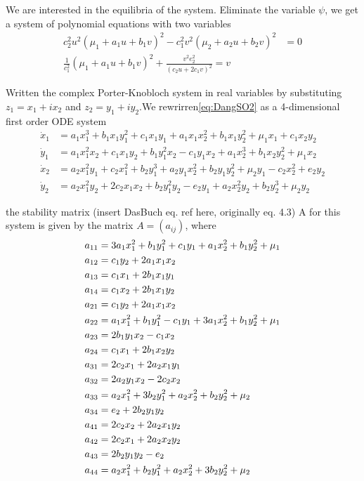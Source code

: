 \documentclass{article}
\begin{document}
We are interested in the equilibria of the system. Eliminate the variable $\psi$, we get a system of polynomial equations with two variables
\begin{align}
c_2^2u^2(\mu_1+a_1u+b_1v)^2-c_1^2v^2(\mu_2+a_2u+b_2v)^2&=0\\
\frac{1}{c_1^2}(\mu_1+a_1u+b_1v)^2+\frac{v^2e_2^2}{(c_2u+2c_1v)^2}=v
\end{align}


Written the complex Porter-Knobloch system in real variables by substituting $z_1 = x_1 + i x_2$ and $z_2 = y_1 + i y_2$.We rewrirren\ref{eq:DangSO2} as a 4-dimensional first order ODE system			
			\begin{align}
				\dot{x}_1 &= a_1 x_1^3 + b_1 x_1 y_1^2 + c_1 x_1 y_1 + a_1 x_1 x_2^2 + b_1 x_1 y_2^2 + \mu_1 x_1 + c_1 x_2 y_2\\
				\dot{y}_1 &= a_1 x_1^2 x_2 + c_1 x_1 y_2 + b_1 y_1^2 x_2 - c_1 y_1 x_2 + a_1 x_2^3 + b_1 x_2 y_2^2 + \mu_1 x_2\\
				\dot{x}_2 &= a_2 x_1^2 y_1 + c_2 x_1^2 + b_2 y_1^3 + a_2 y_1 x_2^2 + b_2 y_1 y_2^2 + \mu_2 y_1 - c_2 x_2^2 + e_2 y_2\\
				\dot{y}_2 &= a_2 x_1^2 y_2 + 2 c_2 x_1 x_2 + b_2 y_1^2 y_2 - e_2 y_1 + a_2 x_2^2 y_2 + b_2 y_2^3 + \mu_2 y_2
			\end{align}

the stability matrix ({insert DasBuch eq. ref here, originally eq. 4.3}) A for this 				system is given by the matrix $A=(a_{ij})$, where
\begin{align}
a_{11}&=3 a_1 x_1^2 + b_1 y_1^2 + c_1 y_1 + a_1 x_2^2 + b_1 y_2^2 + \mu_1\\
a_{12}&=c_1 y_2 + 2 a_1 x_1 x_2\\
a_{13}&=c_1 x_1 + 2 b_1 x_1 y_1\\
a_{14}&=c_1 x_2 + 2 b_1 x_1 y_2\\
a_{21}&=c_1 y_2 + 2 a_1 x_1 x_2\\
a_{22}&=a_1 x_1^2 + b_1 y_1^2 - c_1 y_1 + 3 a_1 x_2^2 + b_1 y_2^2 + \mu_1\\
a_{23}&=2 b_1 y_1 x_2 - c_1 x_2\\
a_{24}&=c_1 x_1 + 2 b_1 x_2 y_2\\
a_{31}&=2 c_2 x_1 + 2 a_2 x_1 y_1\\
a_{32}&=2 a_2 y_1 x_2 - 2 c_2 x_2\\
a_{33}&=a_2 x_1^2 + 3 b_2 y_1^2 + a_2 x_2^2 + b_2 y_2^2 + \mu_2\\
a_{34}&=e_2 + 2 b_2 y_1 y_2\\
a_{41}&= 2 c_2 x_2 + 2 a_2 x_1 y_2\\
a_{42}&=2 c_2 x_1 + 2 a_2 x_2 y_2\\
a_{43}&= 2 b_2 y_1 y_2 - e_2\\
a_{44}&=a_2 x_1^2 + b_2 y_1^2 + a_2 x_2^2 + 3 b_2 y_2^2 + \mu_2
\label{{2modeStabMatrix}}
\end{align}
\end{document}
